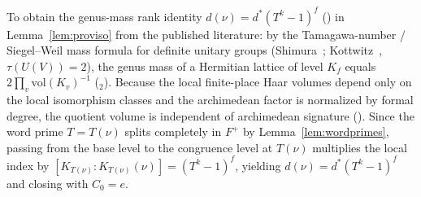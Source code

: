 \documentclass[11pt]{amsart}
\theoremstyle{plain}
\theoremstyle{definition}
\numberwithin{equation}{section}
\begin{document}
\noindent To obtain the genus-mass rank identity $d(\nu)=d^\ast(T^k-1)^f$ ()
in Lemma~\ref{lem:proviso} from the published literature: by the Tamagawa-number / Siegel--Weil
mass formula for definite unitary groups (Shimura~\cite[Thm.~5.8]{shimura-mass};
Kottwitz~\cite{kottwitz-tamagawa}, $\tau(U(V))=2$), the genus mass of a Hermitian lattice of
level $K_f$ equals $2\prod_v\mathrm{vol}(K_v)^{-1}$ ($_2$). Because the
local finite-place Haar volumes depend only on the local isomorphism classes and the archimedean
factor is normalized by formal degree, the quotient volume is independent of archimedean signature
(). Since the word prime $T=T(\nu)$ splits completely in $F^+$ by
Lemma~\ref{lem:wordprimes}, passing from the base level to the congruence level at $T(\nu)$
multiplies the local index by $[K_{T(\nu)}:K_{T(\nu)}(\nu)]=(T^k-1)^f$, yielding
$d(\nu)=d^\ast(T^k-1)^f$ and closing  with $C_0=e$.
\end{document}
